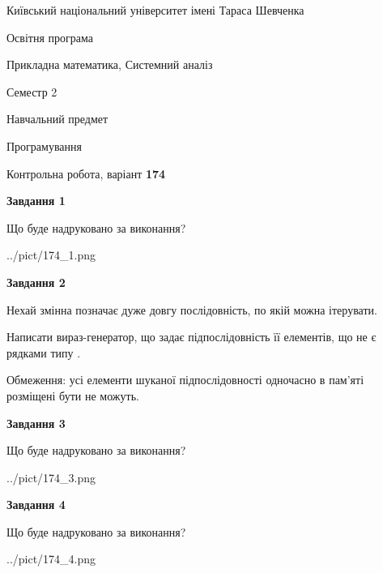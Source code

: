 \documentclass[12pt, ukrainian]{article}
\begin{document}
{{\begin {small}\par
{ \center  Київський національний університет імені Тараса Шевченка \par}
{\parbox {5 cm}{Освітня програма \hfill}{\parbox {8 cm}{Прикладна математика, Системний аналіз \hfill}}\parbox {5 cm}{\hfill Семестр 2}}\par
{\parbox {5 cm} {Навчальний предмет \hfill}\parbox {7 cm}{Програмування \hfill}\parbox {6cm}{\hfill}\par}\vspace{-7pt} \end{small}}{\center Контрольна робота, варіант  \No \textbf
{ 174 }\par}}
{
\begin {large}
{\begin {center}\textbf{Завдання 1}\end {center}}\par
Що буде надруковано за виконання?\par\par
\begin{center}
	{../pict/174_1.png}
\end{center}
\newpage

{\begin {center}\textbf{Завдання 2}\end {center}}\par
Нехай змінна  позначає дуже довгу послідовність, по якій можна ітерувати.

Написати вираз-генератор, що задає підпослідовність її елементів, що не є рядками типу .

Обмеження: усі елементи шуканої підпослідовності одночасно в пам'яті розміщені бути не можуть.\par
\newpage

{\begin {center}\textbf{Завдання 3}\end {center}}\par
Що буде надруковано за виконання?\par
\begin{center}
	{../pict/174_3.png}
\end{center}
\newpage

{\begin {center}\textbf{Завдання 4}\end {center}}\par
Що буде надруковано за виконання?\par
\begin{center}
	{../pict/174_4.png}
\end{center}
\newpage


\end{large}}
\end{document}
